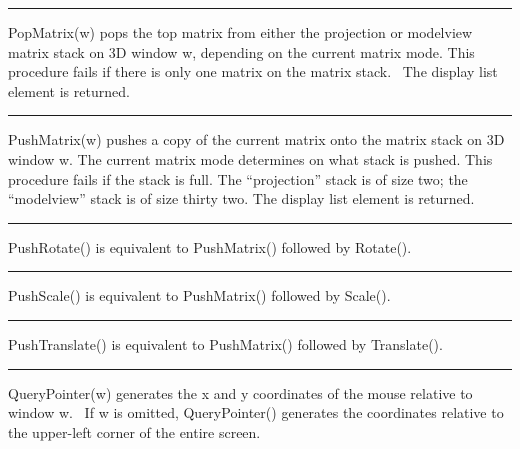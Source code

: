 \bigskip\hrule\vspace{0.1cm}

\noindent
\textsf{PopMatrix(w)} pops the top matrix from either the projection or
modelview matrix stack on 3D window \textsf{w}, depending on the
current matrix mode\textsf{.} This procedure fails if there is only one
matrix on the matrix stack. \ The display list element is returned. 

\bigskip\hrule\vspace{0.1cm}

\noindent
\textsf{PushMatrix(w)} pushes a copy of the current matrix onto the
matrix stack on 3D window \textsf{w}. The current matrix mode
determines on what stack is pushed. This procedure fails if the stack
is full. The \textsf{{\textquotedblleft}projection{\textquotedblright}}
stack is of size two; the
\textsf{{\textquotedblleft}modelview{\textquotedblright}} stack is of
size thirty two. The display list element is returned.

\bigskip\hrule\vspace{0.1cm}

\noindent
\textsf{PushRotate()} is equivalent to \textsf{PushMatrix()} followed by
\textsf{Rotate()}.

\bigskip\hrule\vspace{0.1cm}

\noindent
{\sffamily
PushScale()\textrm{ is equivalent to }PushMatrix()\textrm{ followed by
}Scale()\textrm{.}}

\bigskip\hrule\vspace{0.1cm}

\noindent
{\sffamily
PushTranslate()\textrm{ is equivalent to }PushMatrix()\textrm{ followed
by }Translate()\textrm{.}}

\bigskip\hrule\vspace{0.1cm}

\noindent
\textsf{QueryPointer(w)} generates the \textsf{x} and \textsf{y}
coordinates of the mouse relative to window \textsf{w}. \ If \textsf{w}
is omitted, \textsf{QueryPointer()} generates the coordinates relative
to the upper-left corner of the entire screen.

